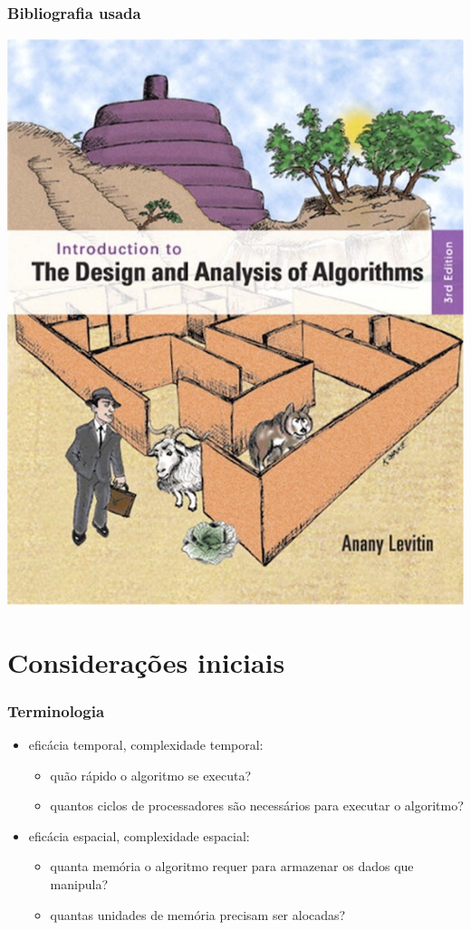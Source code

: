 \documentclass{beamer}
\begin{document}
\begin{frame}

  \frametitle{Bibliografia usada}

  \begin{center}
    \includegraphics[height=.8\textheight]{img/capa-levitin.jpg}
  \end{center}
\end{frame}

\section{Considerações iniciais}

\begin{frame}
  \frametitle{Terminologia}

  \begin{itemize}
  \item eficácia temporal, complexidade temporal:
    \begin{itemize}
    \item quão rápido o algoritmo se executa? 
    \item quantos ciclos de processadores são necessários para executar o
      algoritmo?
    \end{itemize}
  \item eficácia espacial, complexidade espacial:
    \begin{itemize}
    \item quanta memória o algoritmo requer para armazenar os dados que manipula?
    \item quantas unidades de memória precisam ser alocadas?
    \end{itemize}
  \end{itemize}
\end{frame}
\end{document}

